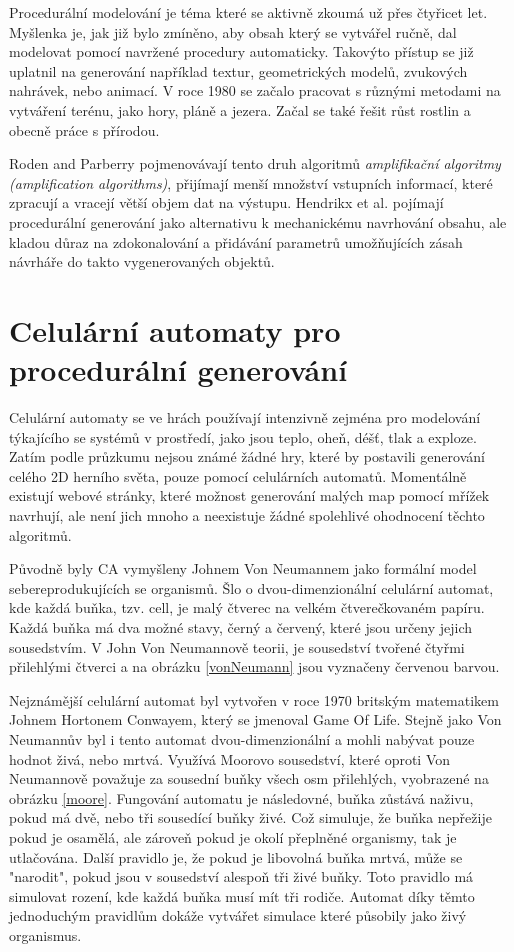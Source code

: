 Procedurální modelování je téma které se aktivně zkoumá už přes čtyřicet let. Myšlenka je, jak již bylo zmíněno, aby obsah který se vytvářel ručně, dal modelovat pomocí navržené procedury automaticky. Takovýto přístup se již uplatnil na generování například textur, geometrických modelů, zvukových nahrávek, nebo animací. V roce 1980 se začalo pracovat s různými metodami na vytváření terénu, jako hory, pláně a jezera. Začal se také řešit růst rostlin a obecně práce s přírodou. \cite{inproceedings}

Roden and Parberry \cite{FromArtistry} pojmenovávají tento druh algoritmů \textit{amplifikační algoritmy (amplification algorithms)}, přijímají menší množství vstupních informací, které zpracují a vracejí větší objem dat na výstupu. Hendrikx et al. \cite{Hendrikx} pojímají procedurální generování jako alternativu k mechanickému navrhování obsahu, ale kladou důraz na zdokonalování a přidávání parametrů umožňujících zásah návrháře do takto vygenerovaných objektů.

\section{Celulární automaty pro procedurální generování}
\label{celular}
Celulární automaty se ve hrách používají intenzivně zejména pro modelování týkajícího se systémů v prostředí, jako jsou teplo, oheň, déšť, tlak a exploze. Zatím podle průzkumu nejsou známé žádné hry, které by postavili generování celého 2D herního světa, pouze pomocí celulárních automatů. Momentálně existují webové stránky, které možnost generování malých map pomocí mřížek navrhují, ale není jich mnoho a neexistuje žádné spolehlivé ohodnocení těchto algoritmů. \cite{articleCellular}

Původně byly CA vymyšleny Johnem Von Neumannem jako formální model sebereprodukujících se organismů. Šlo o dvou-dimenzionální celulární automat, kde každá buňka, tzv. cell, je malý čtverec na velkém čtverečkovaném papíru. Každá buňka má dva možné stavy, černý a červený, které jsou určeny jejich sousedstvím. V John Von Neumannově teorii, je sousedství tvořené čtyřmi přilehlými čtverci a na obrázku \ref{vonNeumann} jsou vyznačeny červenou barvou. \cite{Gong2017}

Nejznámější celulární automat byl vytvořen v roce 1970 britským matematikem Johnem Hortonem Conwayem, který se jmenoval Game Of Life. Stejně jako Von Neumannův byl i tento automat dvou-dimenzionální a mohli nabývat pouze hodnot živá, nebo mrtvá. Využívá Moorovo sousedství, které oproti Von Neumannově považuje za sousední buňky všech osm přilehlých, vyobrazené na obrázku \ref{moore}. Fungování automatu je následovné, buňka zůstává naživu, pokud má dvě, nebo tři sousedící buňky živé. Což simuluje, že buňka nepřežije pokud je osamělá, ale zároveň pokud je okolí přeplněné organismy, tak je utlačována. Další pravidlo je, že pokud je libovolná buňka mrtvá, může se "narodit", pokud jsou v sousedství alespoň tři živé buňky. Toto pravidlo má simulovat rození, kde každá buňka musí mít tři rodiče. Automat díky těmto jednoduchým pravidlům dokáže vytvářet simulace které působily jako živý organismus. \cite{Gong2017}

